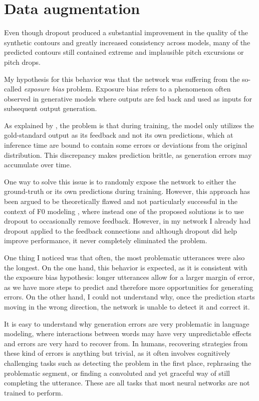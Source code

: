 \section{Data augmentation}

Even though dropout produced a substantial improvement in the quality of the synthetic contours and greatly increased consistency across models, many of the predicted contours still contained extreme and implausible pitch excursions or pitch drops.

My hypothesis for this behavior was that the network was suffering from the so-called \textit{exposure bias} problem.
Exposure bias refers to a phenomenon often observed in generative models where outputs are fed back and used as inputs for subsequent output generation.

As explained by \citet{Ranzato2015Sequence}, the problem is that during training, the model only utilizes the gold-standard output as its feedback and not its own predictions, which at inference time are bound to contain some errors or deviations from the original distribution.
This discrepancy makes prediction brittle, as generation errors may accumulate over time.

One way to solve this issue is to randomly expose the network to either the ground-truth or its own predictions during training.
However, this approach has been argued to be theoretically flawed \citep{Huszar2015How} and not particularly successful in the context of \ac{F0} modeling \citep{Wang2017RNN}, where instead one of the proposed solutions is to use dropout to occasionally remove feedback.
However, in my network I already had dropout applied to the feedback connections and although dropout did help improve performance, it never completely eliminated the problem.

One thing I noticed was that often, the most problematic utterances were also the longest.
On the one hand, this behavior is expected, as it is consistent with the exposure bias hypothesis: longer utterances allow for a larger margin of error, as we have more steps to predict and therefore more opportunities for generating errors.
On the other hand, I could not understand why, once the prediction starts moving in the wrong direction, the network is unable to detect it and correct it.

It is easy to understand why generation errors are very problematic in language modeling, where interactions between words may have very unpredictable effects and errors are very hard to recover from.
In humans, recovering strategies from these kind of errors is anything but trivial, as it often involves cognitively challenging tasks such as detecting the problem in the first place, rephrasing the problematic segment, or finding a convoluted and yet graceful way of still completing the utterance.
These are all tasks that most neural networks are not trained to perform.

